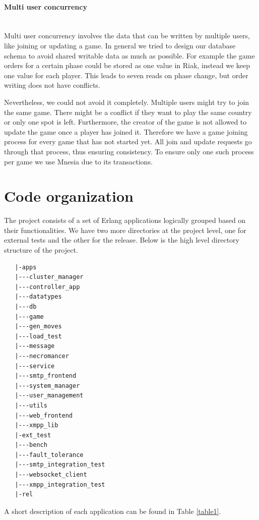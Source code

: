 \documentclass[11pt,a4paper]{report}
\newcommand{\subsubsubsection}[1]{\paragraph{#1}\mbox{}\\}
\begin{document}
\subsubsubsection{Multi user concurrency}
Multi user concurrency involves the data that can be written by multiple users,
like joining or updating a game.
In general we tried to  design our database schema to avoid shared writable data
as much as possible.
For example the game orders for a certain phase could be stored as one value in
Riak, instead we keep one value for each player.
This leads to seven reads on phase change, but order writing does not have
conflicts.

Nevertheless, we could not avoid it completely.
Multiple users might try to join the same game.
There might be a conflict if they want to play the same country or only one
spot is left.
Furthermore, the creator of the game is not allowed to update the game once a
player has joined it.
Therefore we have a game joining process for every game that has not started
yet.
All join and update requests go through that process, thus ensuring consistency.
To ensure only one such process per game we use Mnesia due to its transactions.

\section{Code organization}

The project consists of a set of Erlang applications logically grouped
based on their functionalities. We have two more directories at the
project level, one for external tests and the other for the release.
Below is the high level directory structure of the project.

\begin{verbatim}
   |-apps
   |---cluster_manager
   |---controller_app
   |---datatypes
   |---db
   |---game
   |---gen_moves
   |---load_test
   |---message
   |---necromancer
   |---service
   |---smtp_frontend
   |---system_manager
   |---user_management
   |---utils
   |---web_frontend
   |---xmpp_lib
   |-ext_test
   |---bench
   |---fault_tolerance
   |---smtp_integration_test
   |---websocket_client
   |---xmpp_integration_test
   |-rel
\end{verbatim}

A short description of each application can be found in Table \ref{table1}.
\end{document}
